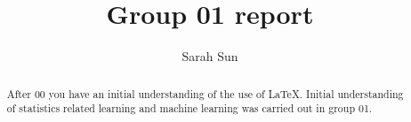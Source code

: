 \documentclass{amsart}
\begin{document}
%
%
\title[Group 01]{Group 01 report}%

\author{Sarah Sun}
\address[A.~3]{School of Information Technology \\
Deakin University \\
Vic 3125, Australia}%

%
\date{\gitAuthorDate}%

\begin{abstract}
	After 00 you have an initial understanding of the use of LaTeX. Initial understanding of statistics related learning and machine learning was carried out in group 01.
\end{abstract}

%


\maketitle
\tableofcontents

\newpage



\newpage



\listoftodos
\end{document}
